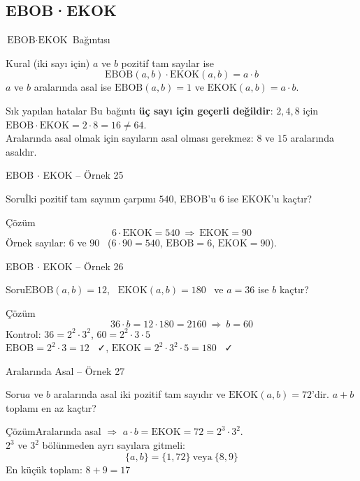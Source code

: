 \documentclass[aspectratio=169,11pt,handout]{beamer}
\newcommand{\soru}[3]{%
\begin{frame}{#1}
  \begin{block}{Soru}\large #2\end{block}
  \pause
  \begin{exampleblock}{Çözüm}\large #3\end{exampleblock}
\end{frame}}
\begin{document}
\subsection{EBOB·EKOK}
\begin{frame}{\(\text{EBOB}\cdot\text{EKOK}\) Bağıntısı}
\begin{block}{Kural (iki sayı için)}
\(a\) ve \(b\) pozitif tam sayılar ise
\[\text{EBOB}(a,b)\cdot\text{EKOK}(a,b)=a\cdot b\]
\(a\) ve \(b\) aralarında asal ise \(\text{EBOB}(a,b)=1\) ve \(\text{EKOK}(a,b)=a\cdot b\).
\end{block}
\begin{alertblock}{Sık yapılan hatalar}
Bu bağıntı \textbf{üç sayı için geçerli değildir}: \(2,4,8\) için \(\text{EBOB}\cdot\text{EKOK}=2\cdot 8=16\neq 64\).\\
Aralarında asal olmak için sayıların asal olması gerekmez: \(8\) ve \(15\) aralarında asaldır.
\end{alertblock}
\end{frame}

\soru{EBOB $\cdot$ EKOK -- Örnek 25}
{İki pozitif tam sayının çarpımı \(540\), EBOB'u \(6\) ise EKOK'u kaçtır?}
{\[6\cdot\text{EKOK}=540\ \Rightarrow\ \text{EKOK}=90\]
Örnek sayılar: \(6\) ve \(90\) \ (\(6\cdot 90=540\), \(\text{EBOB}=6\), \(\text{EKOK}=90\)).}

\soru{EBOB $\cdot$ EKOK -- Örnek 26}
{\(\text{EBOB}(a,b)=12\), \ \(\text{EKOK}(a,b)=180\) \ ve \(a=36\) ise \(b\) kaçtır?}
{\[36\cdot b=12\cdot 180=2160\ \Rightarrow\ b=60\]
Kontrol: \(36=2^2\cdot 3^2\), \(60=2^2\cdot 3\cdot 5\)\\[3pt]
\(\text{EBOB}=2^2\cdot 3=12\) \ ✓, \quad \(\text{EKOK}=2^2\cdot 3^2\cdot 5=180\) \ ✓}

\soru{Aralarında Asal -- Örnek 27}
{\(a\) ve \(b\) aralarında asal iki pozitif tam sayıdır ve \(\text{EKOK}(a,b)=72\)'dir. \(a+b\) toplamı en az kaçtır?}
{Aralarında asal \(\Rightarrow\) \(a\cdot b=\text{EKOK}=72=2^3\cdot 3^2\).\\[3pt]
\(2^3\) ve \(3^2\) bölünmeden ayrı sayılara gitmeli:
\[\{a,b\}=\{1,72\}\ \text{veya}\ \{8,9\}\]
En küçük toplam: \(8+9=17\)}
\end{document}
